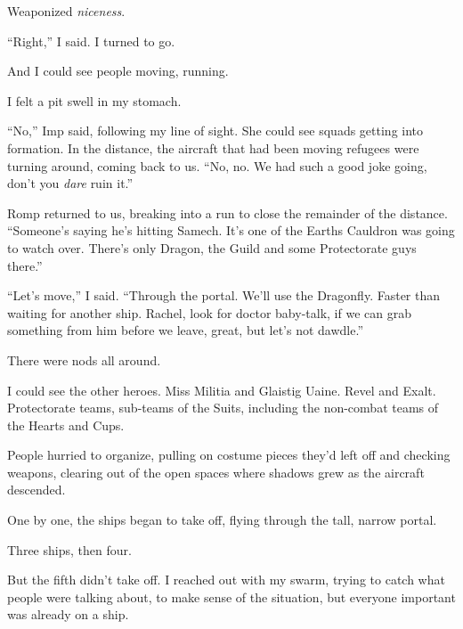 Weaponized\emph{ niceness}.



``Right,'' I said.  I turned to go.



And I could see people moving, running.



I felt a pit swell in my stomach.



``No,'' Imp said, following my line of sight.  She could see squads getting into formation.  In the distance, the aircraft that had been moving refugees were turning around, coming back to us.  ``No, no.  We had such a good joke going, don't you \emph{dare} ruin it.''



Romp returned to us, breaking into a run to close the remainder of the distance.  ``Someone's saying he's hitting Samech.  It's one of the Earths Cauldron was going to watch over.  There's only Dragon, the Guild and some Protectorate guys there.''



``Let's move,'' I said.  ``Through the portal.  We'll use the Dragonfly.  Faster than waiting for another ship.  Rachel, look for doctor baby-talk, if we can grab something from him before we leave, great, but let's not dawdle.''



There were nods all around.



I could see the other heroes.  Miss Militia and Glaistig Uaine.  Revel and Exalt.  Protectorate teams, sub-teams of the Suits, including the non-combat teams of the Hearts and Cups.



People hurried to organize, pulling on costume pieces they'd left off and checking weapons, clearing out of the open spaces where shadows grew as the aircraft descended.



One by one, the ships began to take off, flying through the tall, narrow portal.



Three ships, then four.



But the fifth didn't take off.  I reached out with my swarm, trying to catch what people were talking about, to make sense of the situation, but everyone important was already on a ship.



